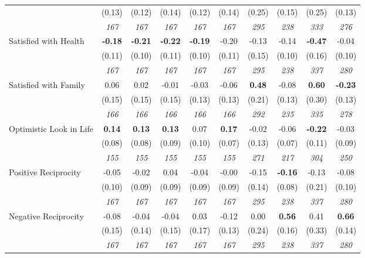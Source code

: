\begin{tabular}{l c c c c c c c c c}
& (0.13) & (0.12) & (0.14) & (0.12) & (0.14) & (0.25) & (0.15) & (0.25) & (0.13) \\
& \textit{ 167 } & \textit{ 167 } & \textit{ 167 } & \textit{ 167 } & \textit{ 167 } & \textit{ 295 } & \textit{ 238 } & \textit{ 333 } & \textit{ 276 } \\
Satisfied with Health & \textbf{ -0.18 } & \textbf{ -0.21 } & \textbf{ -0.22 } & \textbf{-0.19} & -0.20 & -0.13 & -0.14 & \textbf{ -0.47 } & -0.04 \\
& (0.11) & (0.10) & (0.11) & (0.10) & (0.11) & (0.15) & (0.10) & (0.16) & (0.10) \\
& \textit{ 167 } & \textit{ 167 } & \textit{ 167 } & \textit{ 167 } & \textit{ 167 } & \textit{ 295 } & \textit{ 238 } & \textit{ 337 } & \textit{ 280 } \\
Satisfied with Family & 0.06 & 0.02 & -0.01 & -0.03 & -0.06 & \textbf{ 0.48 } & -0.08 & \textbf{ 0.60 } & \textbf{-0.23} \\
& (0.15) & (0.15) & (0.15) & (0.13) & (0.13) & (0.21) & (0.13) & (0.30) & (0.13) \\
& \textit{ 166 } & \textit{ 166 } & \textit{ 166 } & \textit{ 166 } & \textit{ 166 } & \textit{ 292 } & \textit{ 235 } & \textit{ 335 } & \textit{ 278 } \\
Optimistic Look in Life & \textbf{ 0.14 } & \textbf{ 0.13 } & \textbf{ 0.13 } & 0.07 & \textbf{0.17} & -0.02 & -0.06 & \textbf{ -0.22 } & -0.03 \\
& (0.08) & (0.08) & (0.09) & (0.10) & (0.07) & (0.13) & (0.07) & (0.11) & (0.09) \\
& \textit{ 155 } & \textit{ 155 } & \textit{ 155 } & \textit{ 155 } & \textit{ 155 } & \textit{ 271 } & \textit{ 217 } & \textit{ 304 } & \textit{ 250 } \\
Positive Reciprocity & -0.05 & -0.02 & 0.04 & -0.04 & -0.00 & -0.15 & \textbf{-0.16} & -0.13 & -0.08 \\
& (0.10) & (0.09) & (0.09) & (0.09) & (0.09) & (0.14) & (0.08) & (0.21) & (0.10) \\
& \textit{ 167 } & \textit{ 167 } & \textit{ 167 } & \textit{ 167 } & \textit{ 167 } & \textit{ 295 } & \textit{ 238 } & \textit{ 337 } & \textit{ 280 } \\
Negative Reciprocity & -0.08 & -0.04 & -0.04 & 0.03 & -0.12 & 0.00 & \textbf{0.56} & 0.41 & \textbf{0.66} \\
& (0.15) & (0.14) & (0.15) & (0.17) & (0.13) & (0.24) & (0.16) & (0.33) & (0.14) \\
& \textit{ 167 } & \textit{ 167 } & \textit{ 167 } & \textit{ 167 } & \textit{ 167 } & \textit{ 295 } & \textit{ 238 } & \textit{ 337 } & \textit{ 280 } \\
\bottomrule
\end{tabular}
